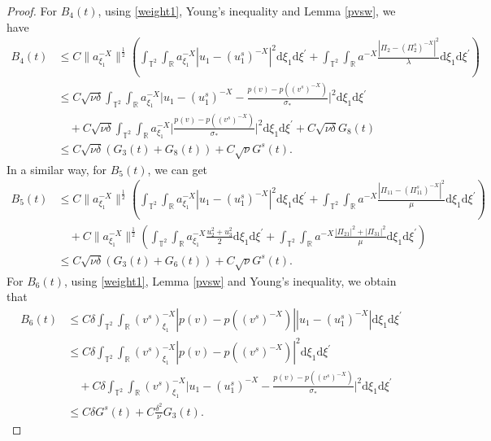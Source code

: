 \documentclass[10pt,reqno]{amsart}
\numberwithin{equation}{section}
\newcommand{\dif}{\mathrm{d}}
\begin{document}
\begin{proof}
For $B_4(t)$, using \eqref{weight1}, Young's inequality and Lemma \ref{pvsw}, we have
\begin{align*}
B_4(t)&\le C\|a^{-X}_{\xi_1}\|^{\frac{1}{2}}
\left(\int_{\mathbb{T}^2}\int_{\mathbb{R}}a^{-X}_{\xi_1}|u_1-(u_1^s)^{-X}|^2\dif \xi_1\dif \xi^{\prime}+
\int_{\mathbb{T}^2}\int_{\mathbb{R}}a^{-X}\frac{|\Pi_2-(\Pi_2^s)^{-X}|^2}{\lambda}\dif \xi_1\dif \xi^{\prime}\right)\\
&\le C\sqrt{\nu\delta}\int_{\mathbb{T}^2}\int_{\mathbb{R}}a^{-X}_{\xi_1}\Big|u_1-(u_1^s)^{-X}
-\frac{p(v)-p((v^s)^{-X})}{\sigma_\ast}\Big|^2\dif \xi_1\dif \xi^{\prime}\\
&\quad+
C\sqrt{\nu\delta}\int_{\mathbb{T}^2}\int_{\mathbb{R}}a^{-X}_{\xi_1}\Big|\frac{p(v)-p((v^s)^{-X})}{\sigma_\ast}\Big|^2\dif \xi_1\dif \xi^{\prime}
 +C\sqrt{\nu\delta}G_8(t)\\
&\le C\sqrt{\nu\delta}(G_3(t)+G_8(t))+C\sqrt{\nu}G^s(t).
\end{align*}
In a similar way, for $B_5(t)$, we can get
\begin{align*}
B_5(t)&\le C\|a^{-X}_{\xi_1}\|^{\frac{1}{2}}\left(\int_{\mathbb{T}^2}\int_{\mathbb{R}}a^{-X}_{\xi_1}|u_1-(u_1^s)^{-X}|^2\dif \xi_1\dif \xi^{\prime}+
\int_{\mathbb{T}^2}\int_{\mathbb{R}}a^{-X}\frac{|\Pi_{11}-(\Pi_{11}^s)^{-X}|^2}{\mu}\dif \xi_1\dif \xi^{\prime}\right)\\
&\quad+C\|a^{-X}_{\xi_1}\|^{\frac{1}{2}}\left(\int_{\mathbb{T}^2}\int_{\mathbb{R}}a^{-X}_{\xi_1}
\frac{u_2^2+u_3^2}{2}\dif \xi_1\dif \xi^{\prime}+
\int_{\mathbb{T}^2}\int_{\mathbb{R}}a^{-X}\frac{|\Pi_{21}|^2+|\Pi_{31}|^2}{\mu}\dif \xi_1\dif \xi^{\prime}\right)\\
&\le C\sqrt{\nu\delta}(G_3(t)+G_6(t))+C\sqrt{\nu}G^s(t).
\end{align*}
For $B_6(t)$, using \eqref{weight1}, Lemma \ref{pvsw} and Young's inequality, we obtain that
\begin{align*}
B_6(t)&\le C\delta\int_{\mathbb{T}^2}\int_{\mathbb{R}}(v^s)^{-X}_{\xi_1}|p(v)-p((v^s)^{-X})||u_1-(u_1^s)^{-X}|\dif \xi_1\dif \xi^{\prime}\\
&\le C\delta\int_{\mathbb{T}^2}\int_{\mathbb{R}}(v^s)^{-X}_{\xi_1}|p(v)-p((v^s)^{-X})|^2\dif \xi_1\dif \xi^{\prime}\\
&\quad+C\delta\int_{\mathbb{T}^2}\int_{\mathbb{R}}(v^s)^{-X}_{\xi_1}\Big|u_1-(u_1^s)^{-X}
-\frac{p(v)-p((v^s)^{-X})}{\sigma_\ast}\Big|^2\dif \xi_1\dif \xi^{\prime}\\
&\le C\delta G^s(t)+C\frac{\delta^2}{\nu}G_3(t).
\end{align*}

\end{proof}
\end{document}
